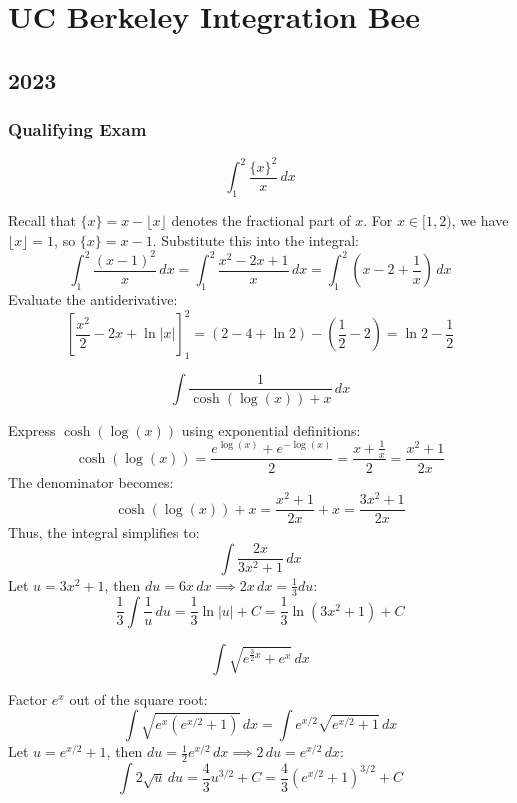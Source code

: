 \section{UC Berkeley Integration Bee}
\subsection*{2023}
\subsubsection*{Qualifying Exam}

\begin{questions}

\question
\[ \int_1^2 \frac{\{x\}^2}{x} \, dx \]
\begin{solution}
Recall that $\{x\} = x - \lfloor x \rfloor$ denotes the fractional part of $x$. For $x \in [1, 2)$, we have $\lfloor x \rfloor = 1$, so $\{x\} = x - 1$.
Substitute this into the integral:
\[ \int_1^2 \frac{(x-1)^2}{x} \, dx = \int_1^2 \frac{x^2 - 2x + 1}{x} \, dx = \int_1^2 \left( x - 2 + \frac{1}{x} \right) \, dx \]
Evaluate the antiderivative:
\[ \left[ \frac{x^2}{2} - 2x + \ln|x| \right]_1^2 = (2 - 4 + \ln 2) - \left( \frac{1}{2} - 2 \right) = \ln 2 - \frac{1}{2} \]
\end{solution}

\question
\[ \int \frac{1}{\cosh(\log(x)) + x} \, dx \]
\begin{solution}
Express $\cosh(\log(x))$ using exponential definitions:
\[ \cosh(\log(x)) = \frac{e^{\log(x)} + e^{-\log(x)}}{2} = \frac{x + \frac{1}{x}}{2} = \frac{x^2 + 1}{2x} \]
The denominator becomes:
\[ \cosh(\log(x)) + x = \frac{x^2 + 1}{2x} + x = \frac{3x^2 + 1}{2x} \]
Thus, the integral simplifies to:
\[ \int \frac{2x}{3x^2 + 1} \, dx \]
Let $u = 3x^2 + 1$, then $du = 6x \, dx \implies 2x \, dx = \frac{1}{3} du$:
\[ \frac{1}{3} \int \frac{1}{u} \, du = \frac{1}{3} \ln|u| + C = \frac{1}{3} \ln(3x^2 + 1) + C \]
\end{solution}

\question
\[ \int \sqrt{e^{\frac{3}{2}x} + e^x} \, dx \]
\begin{solution}
Factor $e^x$ out of the square root:
\[ \int \sqrt{e^x(e^{x/2} + 1)} \, dx = \int e^{x/2} \sqrt{e^{x/2} + 1} \, dx \]
Let $u = e^{x/2} + 1$, then $du = \frac{1}{2} e^{x/2} \, dx \implies 2 \, du = e^{x/2} \, dx$:
\[ \int 2\sqrt{u} \, du = \frac{4}{3} u^{3/2} + C = \frac{4}{3} \left(e^{x/2} + 1\right)^{3/2} + C \]
\end{solution}


\end{questions}
